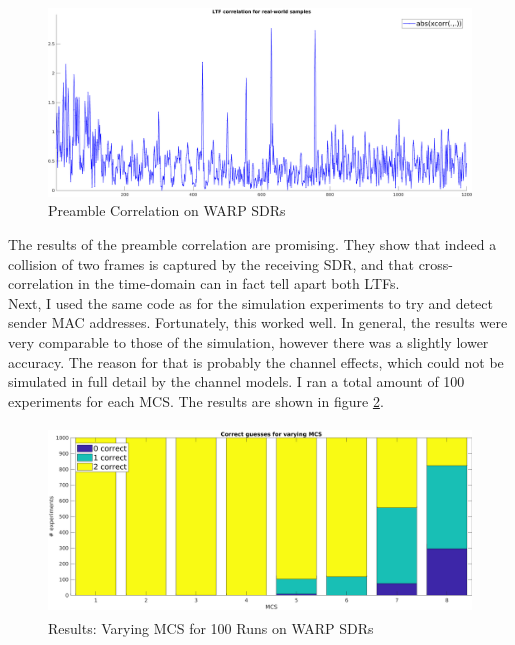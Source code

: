 \begin{figure}[H]
	\centering
  \includegraphics[width=\textwidth]{gfx/plots/warp-preamble}
	\caption{Preamble Correlation on WARP SDRs}
	\label{fig:warp_preamble_corr}
\end{figure}

The results of the preamble correlation are promising. They show that indeed a collision of two frames is captured by the receiving \gls{SDR}, and that cross-correlation in the time-domain can in fact tell apart both \glspl{LTF}.\\

Next, I used the same code as for the simulation experiments to try and detect sender \gls{MAC} addresses. Fortunately, this worked well. In general, the results were very comparable to those of the simulation, however there was a slightly lower accuracy. The reason for that is probably the channel effects, which could not be simulated in full detail by the channel models. I ran a total amount of 100 experiments for each \gls{MCS}. The results are shown in figure \ref{fig:warp-mcs-results}.

\begin{figure}[H]
	\centering
	\includegraphics[height=5cm]{gfx/plots/mcs}
	\caption{Results: Varying MCS for 100 Runs on WARP SDRs}
	\label{fig:warp-mcs-results}
\end{figure}
